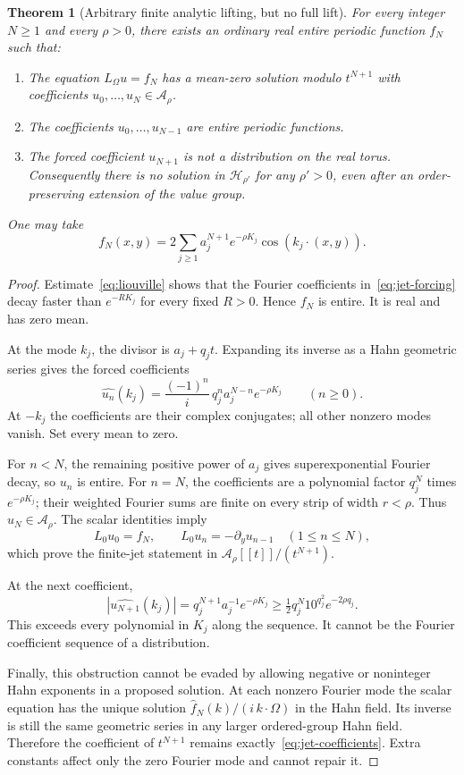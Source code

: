 \documentclass[11pt,letterpaper]{article}
\newtheorem{theorem}{Theorem}[section]
\theoremstyle{definition}
\theoremstyle{remark}
\newcommand{\A}{\mathcal A}
\newcommand{\HH}{\mathcal H}
\newcommand{\Lom}{L_{\Omega}}
\numberwithin{equation}{section}
\begin{document}
\begin{theorem}[Arbitrary finite analytic lifting, but no full lift]
\label{thm:jet}
For every integer $N\ge1$ and every $\rho>0$, there exists an ordinary real
entire periodic function $f_N$ such that:
\begin{enumerate}[label=(\roman*),leftmargin=*]
\item The equation $\Lom u=f_N$ has a mean-zero solution modulo $t^{N+1}$
with coefficients $u_0,\ldots,u_N\in\A_\rho$.
\item The coefficients $u_0,\ldots,u_{N-1}$ are entire periodic functions.
\item The forced coefficient $u_{N+1}$ is not a distribution on the real
torus.  Consequently there is no solution in $\HH_{\rho'}$ for any
$\rho'>0$, even after an order-preserving extension of the value group.
\end{enumerate}
One may take
\begin{equation}\label{eq:jet-forcing}
 f_N(x,y)=2\sum_{j\ge1}a_j^{N+1}e^{-\rho K_j}
                                  \cos(k_j\cdot(x,y)).
\end{equation}
\end{theorem}
\begin{proof}
Estimate~\eqref{eq:liouville} shows that the Fourier coefficients
in~\eqref{eq:jet-forcing} decay faster than $e^{-R K_j}$ for every fixed
$R>0$.  Hence $f_N$ is entire.  It is real and has zero mean.

At the mode $k_j$, the divisor is $a_j+q_jt$.  Expanding its inverse as a
Hahn geometric series gives the forced coefficients
\begin{equation}\label{eq:jet-coefficients}
 \widehat{u_n}(k_j)=
 \frac{(-1)^n}{i}\,q_j^n a_j^{N-n}e^{-\rho K_j}
 \qquad(n\ge0).
\end{equation}
At $-k_j$ the coefficients are their complex conjugates; all other nonzero
modes vanish.  Set every mean to zero.

For $n<N$, the remaining positive power of $a_j$ gives superexponential
Fourier decay, so $u_n$ is entire.  For $n=N$, the coefficients are a
polynomial factor $q_j^N$ times $e^{-\rho K_j}$; their weighted Fourier sums
are finite on every strip of width $r<\rho$.  Thus $u_N\in\A_\rho$.
The scalar identities imply
\[
 L_0u_0=f_N,\qquad L_0u_n=-\partial_yu_{n-1}\quad(1\le n\le N),
\]
which prove the finite-jet statement in $\A_\rho[[t]]/(t^{N+1})$.

At the next coefficient,
\[
 |\widehat{u_{N+1}}(k_j)|
 =q_j^{N+1}a_j^{-1}e^{-\rho K_j}
 \ge\tfrac12 q_j^N10^{q_j^2}e^{-2\rho q_j}.
\]
This exceeds every polynomial in $K_j$ along the sequence.  It cannot be
the Fourier coefficient sequence of a distribution.

Finally, this obstruction cannot be evaded by allowing negative or
noninteger Hahn exponents in a proposed solution.  At each nonzero Fourier
mode the scalar equation has the unique solution
$\widehat f_N(k)/(i\,k\cdot\Omega)$ in the Hahn field.  Its inverse is still
the same geometric series in any larger ordered-group Hahn field.  Therefore
the coefficient of $t^{N+1}$ remains exactly~\eqref{eq:jet-coefficients}.
Extra constants affect only the zero Fourier mode and cannot repair it.
\end{proof}
\end{document}
